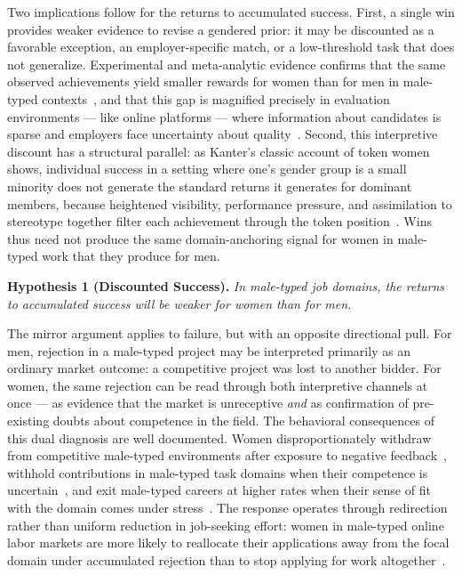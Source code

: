 \documentclass[12pt]{article}
\begin{document}
Two implications follow for the returns to accumulated success. First, a single win provides weaker evidence to revise a gendered prior: it may be discounted as a favorable exception, an employer-specific match, or a low-threshold task that does not generalize. Experimental and meta-analytic evidence confirms that the same observed achievements yield smaller rewards for women than for men in male-typed contexts~\citep{joshi2015gap}, and that this gap is magnified precisely in evaluation environments --- like online platforms --- where information about candidates is sparse and employers face uncertainty about quality~\citep{botelho2017pursuing}. Second, this interpretive discount has a structural parallel: as Kanter's classic account of token women shows, individual success in a setting where one's gender group is a small minority does not generate the standard returns it generates for dominant members, because heightened visibility, performance pressure, and assimilation to stereotype together filter each achievement through the token position~\citep{kanter1977men}. Wins thus need not produce the same domain-anchoring signal for women in male-typed work that they produce for men.

\medskip
\noindent\textbf{Hypothesis 1 (Discounted Success).} \textit{In male-typed job domains, the returns to accumulated success will be weaker for women than for men.}
\medskip

The mirror argument applies to failure, but with an opposite directional pull. For men, rejection in a male-typed project may be interpreted primarily as an ordinary market outcome: a competitive project was lost to another bidder. For women, the same rejection can be read through both interpretive channels at once --- as evidence that the market is unreceptive \emph{and} as confirmation of pre-existing doubts about competence in the field. The behavioral consequences of this dual diagnosis are well documented. Women disproportionately withdraw from competitive male-typed environments after exposure to negative feedback~\citep{niederle2007women}, withhold contributions in male-typed task domains when their competence is uncertain~\citep{coffman2014evidence}, and exit male-typed careers at higher rates when their sense of fit with the domain comes under stress~\citep{cech2013self}. The response operates through redirection rather than uniform reduction in job-seeking effort: women in male-typed online labor markets are more likely to reallocate their applications away from the focal domain under accumulated rejection than to stop applying for work altogether~\citep{yang2025approaching}.
\end{document}
